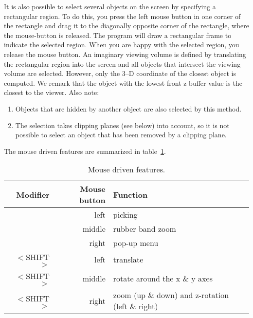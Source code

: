 It is also possible to select several objects on the screen by
specifying a rectangular region. To do this, you press the left mouse
button in one corner of the rectangle and drag it to the diagonally
opposite corner of the rectangle, where the mouse-button is
released. The program will draw a rectangular frame to indicate the
selected region. When you are happy with the selected region, you
release the mouse button. An imaginary viewing volume is defined by
translating the rectangular region into the screen and all objects
that intersect the viewing volume are selected. However, only the 3--D
coordinate of the closest object is computed. We remark that the
object with the lowest front z-buffer value is the closest to the
viewer. Also note:
\begin{enumerate}
\item Objects that are hidden by another object are also selected by
this method.
\item The selection takes clipping planes (see below) into
account, so it is not possible to select an object that has been
removed by a clipping plane.
\end{enumerate}
%
The mouse driven features are summarized in table~\protect\ref{tab:mouse}.
\begin{table}[ht]
\begin{center}
\begin{tabular}{r|r|l}  
Modifier      & Mouse button & Function                      \\ \hline\hline
              & left         & picking                       \\ \hline
              & middle       & rubber band zoom              \\ \hline
              & right        & pop-up menu                   \\ \hline
$<$SHIFT$>$   & left         & translate                     \\ \hline
$<$SHIFT$>$   & middle       & rotate around the x \& y axes \\ \hline
$<$SHIFT$>$   & right        & zoom (up \& down) and z-rotation (left \& right) \\ \hline
\end{tabular}
  \caption{Mouse driven features.}\label{tab:mouse}
\end{center}
\end{table}

\newcommand{\figWidth}{.95\linewidth}
